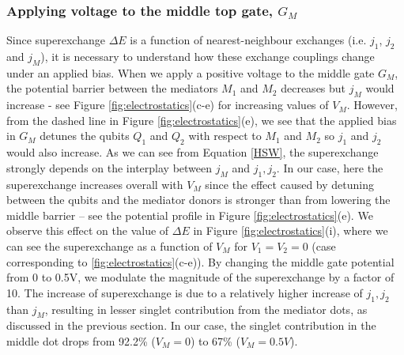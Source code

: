 \documentclass[%
showkeys,
 amsmath,amssymb,
 aps,
prb,
]{revtex4-2}
\begin{document}
\subsubsection{Applying voltage to the middle top gate, $G_M$}
Since superexchange $\Delta E$ is a function of nearest-neighbour exchanges (i.e. $j_1$, $j_2$ and $j_M$), it is necessary to understand how these exchange couplings change under an applied bias. When we apply a positive voltage to the middle gate $G_M$, the potential barrier between the mediators $M_1$ and $M_2$ decreases but $j_M$ would increase - see Figure \ref{fig:electrostatics}(c-e) for increasing values of $V_M$. However, from the dashed line in Figure \ref{fig:electrostatics}(e), we see that the applied bias in $G_M$ detunes the qubits $Q_1$ and $Q_2$ with respect to $M_1$ and $M_2$ so $j_1$ and $j_2$ would also increase. As we can see from Equation \ref{HSW}, the superexchange strongly depends on the interplay between $j_M$ and $j_1, j_2$. In our case, here the superexchange increases overall with $V_M$ since the effect caused by detuning between the qubits and the mediator donors is stronger than from lowering the middle barrier -- see the potential profile in Figure \ref{fig:electrostatics}(e). We observe this effect on the value of $\Delta E$ in Figure \ref{fig:electrostatics}(i), where we can see the superexchange as a function of $V_M$ for $V_1=V_2=0$ (case corresponding to \ref{fig:electrostatics}(c-e)). By changing the middle gate potential from 0 to 0.5V, we modulate the magnitude of the superexchange by a factor of 10. The increase of superexchange is due to a relatively higher increase of $j_1, j_2$ than $j_M$, resulting in lesser singlet contribution from the mediator dots, as discussed in the previous section. In our case, the singlet contribution in the middle dot drops from 92.2\% ($V_M = 0$) to 67\% ($V_M = 0.5V$). 
\end{document}
